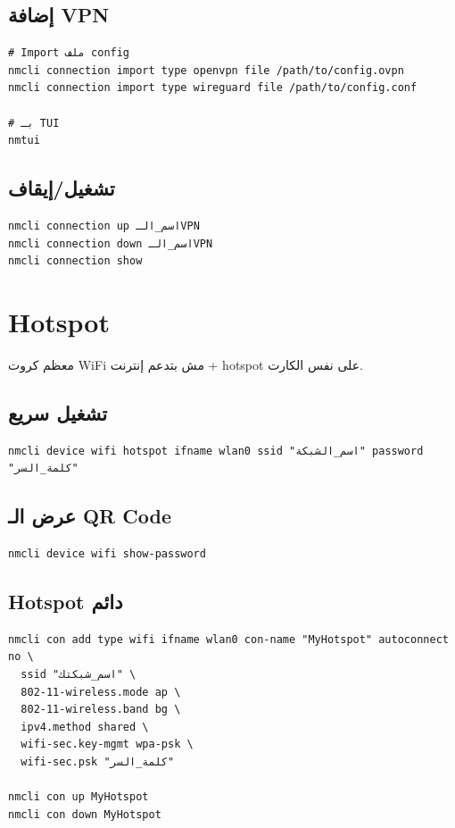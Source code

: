 \documentclass[12pt, a4paper]{report}
\begin{document}
\subsection{إضافة VPN}
\begin{lstlisting}
# Import ملف config
nmcli connection import type openvpn file /path/to/config.ovpn
nmcli connection import type wireguard file /path/to/config.conf

# بـ TUI
nmtui
\end{lstlisting}

\subsection{تشغيل/إيقاف}
\begin{lstlisting}
nmcli connection up اسم_الـVPN
nmcli connection down اسم_الـVPN
nmcli connection show
\end{lstlisting}

\section{Hotspot}

\begin{tcolorbox}[warningbox]
معظم كروت WiFi مش بتدعم إنترنت + hotspot على نفس الكارت.
\end{tcolorbox}

\subsection{تشغيل سريع}
\begin{lstlisting}
nmcli device wifi hotspot ifname wlan0 ssid "اسم_الشبكة" password "كلمة_السر"
\end{lstlisting}

\subsection{عرض الـ QR Code}
\begin{lstlisting}
nmcli device wifi show-password
\end{lstlisting}

\subsection{Hotspot دائم}
\begin{lstlisting}
nmcli con add type wifi ifname wlan0 con-name "MyHotspot" autoconnect no \
  ssid "اسم_شبكتك" \
  802-11-wireless.mode ap \
  802-11-wireless.band bg \
  ipv4.method shared \
  wifi-sec.key-mgmt wpa-psk \
  wifi-sec.psk "كلمة_السر"

nmcli con up MyHotspot
nmcli con down MyHotspot
\end{lstlisting}
\end{document}
